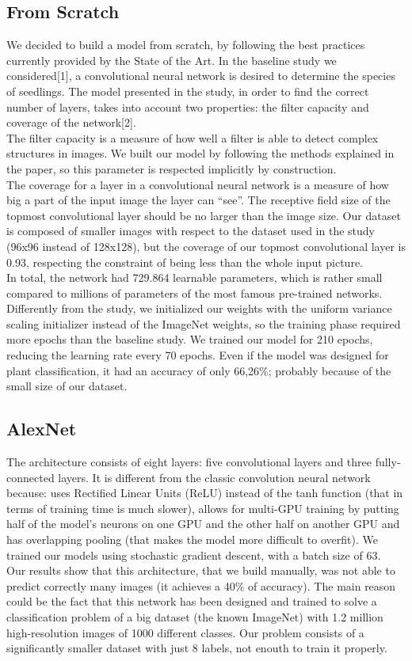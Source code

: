 \documentclass[11pt, oneside]{article}
\begin{document}
\subsection{From Scratch}
We decided to build a model from scratch, by following the best practices currently provided by the State of the Art. In the baseline study we considered[1],  a convolutional neural network is desired to determine the species of seedlings. 
The model presented in the study, in order to find the correct number of layers, takes into account two properties: the filter capacity and coverage of the network[2]. \\
The filter capacity is a measure of how well a filter is able to detect complex structures in images. 
We built our model by following the methods explained in the paper, so this parameter is respected implicitly by construction. \\
The coverage for a layer in a convolutional neural network is a measure of how big a part of the input image the layer can “see”. 
The receptive field size of the topmost convolutional layer should be no larger than the image size. Our dataset is composed of smaller images with respect to the dataset used in the study (96x96 instead of 128x128), but the coverage of our topmost convolutional layer is 0.93, respecting the constraint of being less than the whole input picture. \\
In total, the network had 729.864 learnable parameters, which is rather small compared to millions of parameters of the most famous pre-trained networks. Differently from the study, we initialized our weights with the uniform variance scaling initializer instead of the ImageNet weights, so the training phase required more epochs than the baseline study. We trained our model for 210 epochs, reducing the learning rate every 70 epochs. Even if the model was designed for plant classification, it had an accuracy of only 66,26\%; probably because of the small size of our dataset.
\subsection{AlexNet}
The architecture consists of eight layers: five convolutional layers and three fully-connected layers. It is different from the classic convolution neural network because: uses Rectified Linear Units (ReLU) instead of the tanh function (that in terms of training time is much slower), allows for multi-GPU training by putting half of the model’s neurons on one GPU and the other half on another GPU and has overlapping pooling (that makes the model more difficult to overfit).
We trained our models using stochastic gradient descent, with a batch size of 63.\\
Our results show that this architecture, that we build manually, was not able to predict correctly many images (it achieves a 40\% of accuracy). The main reason could be the fact that this network has been designed and trained to solve a classification problem of a big dataset (the known ImageNet) with  1.2 million high-resolution images of 1000 different classes. Our problem consists of a significantly smaller dataset with just 8 labels, not enouth to train it properly.
\end{document}
